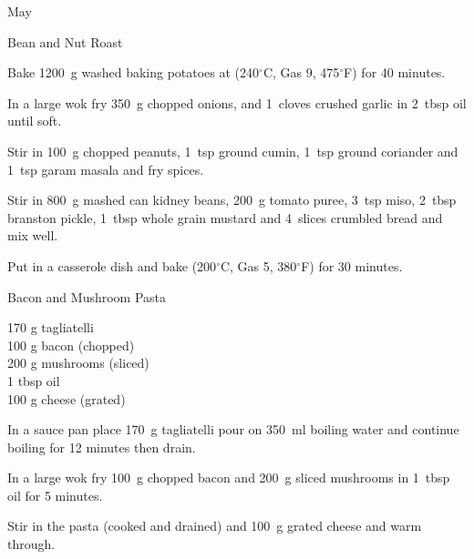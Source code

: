 \begin{menu}{May}
\begin{recipe}{2}{Bean and Nut Roast}
    \begin{instructions}
    \item 
    Bake
    1200~g washed baking potatoes
    at
    (240$^{\circ}$C, Gas 9, 475$^{\circ}$F) for 40 minutes.
  \item 
        In a large wok fry
        350~g chopped onions,
        and
        1~cloves crushed garlic
        in
        2~tbsp  oil
        until soft.
      \item 
        Stir in
        100~g chopped peanuts,
        1~tsp  ground cumin,
        1~tsp  ground coriander
        and
        1~tsp  garam masala
        and fry spices.
      \item 
        Stir in
        800~g mashed can kidney beans,
        200~g  tomato puree,
        3~tsp  miso,
        2~tbsp  branston pickle,
        1~tbsp  whole grain mustard
        and
        4~slices crumbled bread
        and mix well.
      \item 
        Put in a casserole dish and
        bake (200$^{\circ}$C, Gas 5, 380$^{\circ}$F) for 30 minutes.
      
    \end{instructions}
    \end{recipe}%
  
    \begin{recipe}{1}{Bacon and Mushroom Pasta}%
		\begin{ingredients}
		170 g tagliatelli  \\
	100 g bacon (chopped) \\
	200 g mushrooms (sliced) \\
	1 tbsp oil  \\
	100 g cheese (grated) \\
	
		\end{ingredients}
	
	
    \begin{instructions}
    \item 
    In a
    sauce pan
    place
    170~g  tagliatelli
    pour on
    350~ml  boiling water and continue boiling for 12 minutes then drain.
  \item 
        In a large wok fry 100~g chopped bacon
        and
        200~g sliced mushrooms
        in
        1~tbsp  oil for 5 minutes.
      \item 
        Stir in the pasta (cooked and drained)
        and 100~g grated cheese
        and warm through.
      

\end{instructions}
\end{recipe}
\end{menu}
